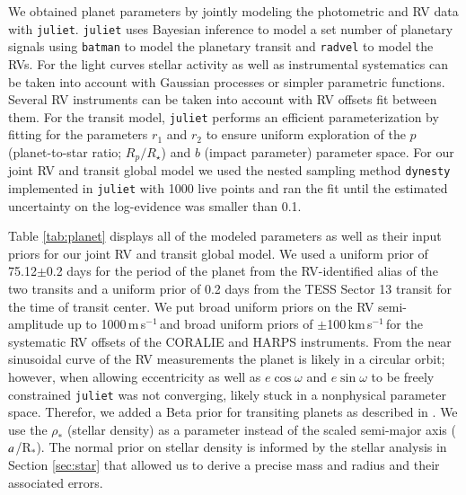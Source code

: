 \documentclass{aa}
\newcommand{\kms}{\mbox{km\,s$^{-1}$}}
\newcommand{\ms}{\mbox{m\,s$^{-1}$}}
\newcommand{\rstar}{\mbox{R$_{*}$}}
\newcommand{\juliet}{{\sc \tt juliet}\xspace}
\newcommand{\radvel}{{\sc \tt radvel}\xspace}
\newcommand{\dynesty}{{\sc \tt dynesty}\xspace}
\begin{document}
We obtained planet parameters by jointly modeling the photometric and RV data with \juliet \citep{Espinoza2019}. \juliet uses Bayesian inference to model a set number of planetary signals using {\sc \tt batman}\xspace \citep{Kreidberg2015} to model the planetary transit and \radvel \citep{Fulton2018} to model the RVs. For the light curves stellar activity as well as instrumental systematics can be taken into account with Gaussian processes \citep[e.g.,][]{Gibson2014} or simpler parametric functions. Several RV instruments can be taken into account with RV offsets fit between them. For the transit model, \juliet performs an efficient parameterization by fitting for the parameters $r_{1}$ and $r_{2}$ to ensure uniform exploration of the $p$ (planet-to-star ratio; $R_p/R_{\star}$) and $b$ (impact parameter) parameter space. For our joint RV and transit global model we used the nested sampling method \dynesty \citep{Speagle2019} implemented in \juliet with 1000 live points and ran the fit until the estimated uncertainty on the log-evidence was smaller than 0.1.

Table \ref{tab:planet} displays all of the modeled parameters as well as their input priors for our joint RV and transit global model. We used a uniform prior of 75.12$\pm$0.2 days for the period of the planet from the RV-identified alias of the two transits and a uniform prior of 0.2 days from the TESS Sector 13 transit for the time of transit center. We put broad uniform priors on the RV semi-amplitude up to 1000\,\ms\,and broad uniform priors of $\pm$100\,\kms\,for the systematic RV offsets of the CORALIE and HARPS instruments. From the near sinusoidal curve of the RV measurements the planet is likely in a circular orbit; however, when allowing eccentricity as well as $e\cos{\omega}$ and $e\sin{\omega}$ to be freely constrained \juliet was not converging, likely stuck in a nonphysical parameter space. Therefor, we added a Beta prior for transiting planets as described in \citet{Kipping2014}. We use the $\rho_*$ (stellar density) as a parameter instead of the scaled semi-major axis ($\it{a}$/\rstar). The normal prior on stellar density is informed by the stellar analysis in Section \ref{sec:star} that allowed us to derive a precise mass and radius and their associated errors. 
\end{document}
